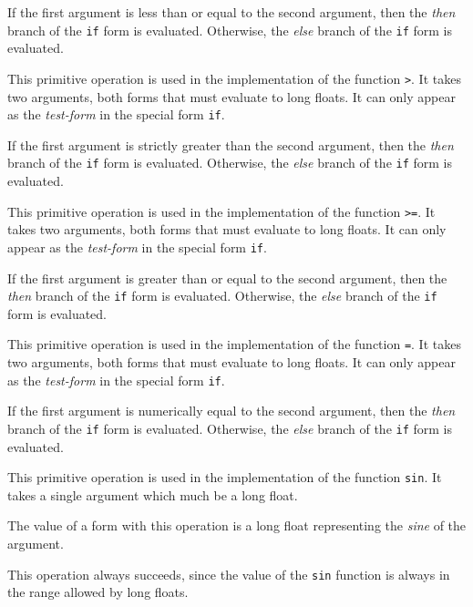 If the first argument is less than or equal to the second argument,
then the \emph{then} branch of the \texttt{if} form is evaluated.
Otherwise, the \emph{else} branch of the \texttt{if} form is
evaluated.


This primitive operation is used in the implementation of the
\commonlisp{} function \texttt{>}.  It takes two arguments, both forms
that must evaluate to long floats.  It can only appear as the
\emph{test-form} in the special form \texttt{if}.

If the first argument is strictly greater than the second argument,
then the \emph{then} branch of the \texttt{if} form is evaluated.
Otherwise, the \emph{else} branch of the \texttt{if} form is
evaluated.


This primitive operation is used in the implementation of the
\commonlisp{} function \texttt{>=}.  It takes two arguments, both forms
that must evaluate to long floats.  It can only appear as the
\emph{test-form} in the special form \texttt{if}.

If the first argument is greater than or equal to the second argument,
then the \emph{then} branch of the \texttt{if} form is evaluated.
Otherwise, the \emph{else} branch of the \texttt{if} form is
evaluated.


This primitive operation is used in the implementation of the
\commonlisp{} function \texttt{=}.  It takes two arguments, both forms
that must evaluate to long floats.  It can only appear as the
\emph{test-form} in the special form \texttt{if}.

If the first argument is numerically equal to the second argument,
then the \emph{then} branch of the \texttt{if} form is evaluated.
Otherwise, the \emph{else} branch of the \texttt{if} form is
evaluated.


This primitive operation is used in the implementation of the
\commonlisp{} function \texttt{sin}.  It takes a single argument which
much be a long float.

The value of a form with this operation is a long float representing
the \emph{sine} of the argument.

This operation always succeeds, since the value of the \texttt{sin}
function is always in the range allowed by long floats.

